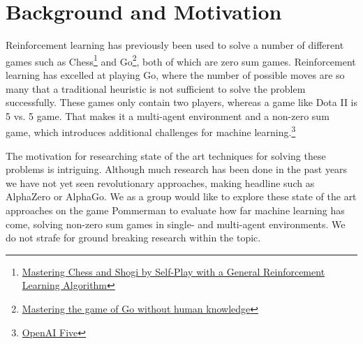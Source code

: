 \section{Background and Motivation}



Reinforcement learning has previously been used to solve a number of different games such as Chess\footnote{\href{https://arxiv.org/pdf/1712.01815.pdf}{Mastering Chess and Shogi by Self-Play with a General Reinforcement Learning Algorithm}} and Go\footnote{\href{https://www.nature.com/articles/nature24270.epdf}{Mastering the game of Go without human knowledge}}, both of which are zero sum games. Reinforcement learning has excelled at playing Go, where the number of possible moves are so many that a traditional heuristic is not sufficient to solve the problem successfully. These games only contain two players, whereas a game like Dota II is 5 vs. 5 game. That makes it a multi-agent environment and a non-zero sum game, which introduces additional challenges for machine learning.\footnote{\href{https://blog.openai.com/openai-five/}{OpenAI Five}}

The motivation for researching state of the art techniques for solving these problems is intriguing. Although much research has been done in the past years we have not yet seen revolutionary approaches, making headline such as AlphaZero or AlphaGo. We as a group would like to explore these state of the art approaches on the game Pommerman to evaluate how far machine learning has come, solving non-zero sum games in single- and multi-agent environments. We do not strafe for ground breaking research within the topic.

